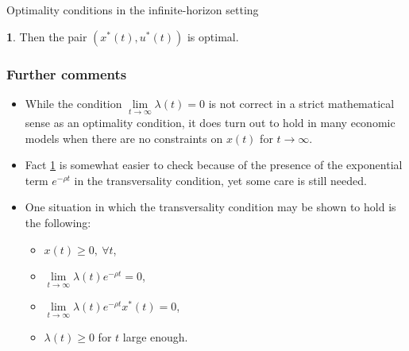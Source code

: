 \documentclass[10pt]{beamer}
\theoremstyle{definition}
\newtheorem{Fact}{\translate{Fact}}
\begin{document}
\begin{section}{Optimality conditions in the infinite-horizon setting}
\begin{frame}[fragile]
\begin{itemize}
\begin{Fact}
Then the pair $ (x^*(t),u^*(t)) $ is optimal.
\label{fc:simpleSC}
\end{Fact}
\end{itemize}
\end{frame}

\begin{frame}[fragile]
\frametitle{Further comments}
\begin{itemize}\itemsep1em
\item While the condition $ \lim\limits_{t\rightarrow \infty}\lambda(t)=0 $ is not correct in a strict mathematical sense as an optimality condition, it does turn out to hold in many economic models when there are no constraints on $ x(t) $ for $ t\rightarrow \infty $.
\item Fact \ref{fc:simpleSC} is somewhat easier to check because of the presence of the exponential term $ e^{-\rho t} $ in the transversality condition, yet some care is still needed.
\item One situation in which the transversality condition may be shown to hold is the following:
	\begin{itemize}\itemsep1em
	\item $ x(t)\geq 0,~\forall t$,
	\item $ \lim\limits_{t\rightarrow \infty} \lambda(t)e^{-\rho t} = 0 $,
	\item $ \lim\limits_{t\rightarrow \infty} \lambda(t)e^{-\rho t}x^*(t) = 0 $,
	\item $ \lambda(t)\geq 0 $ for $ t $ large enough.
	\end{itemize}
\end{itemize}
\end{frame}


\end{section}
\end{document}
